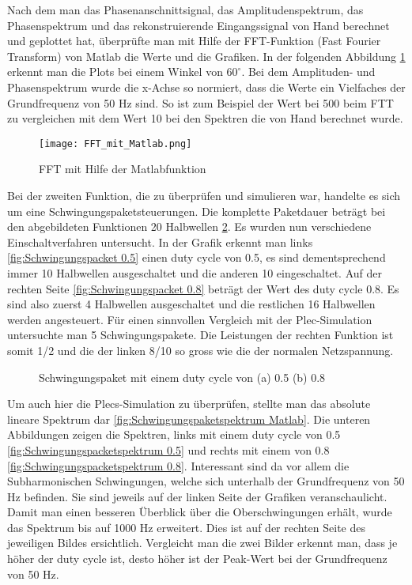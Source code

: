 Nach dem man das Phasenanschnittsignal, das Amplitudenspektrum,  das Phasenspektrum und das rekonstruierende Eingangssignal von Hand berechnet und geplottet hat, überprüfte man mit Hilfe der FFT-Funktion (Fast Fourier Transform) von Matlab die Werte und die Grafiken. In der folgenden Abbildung \ref{fig:FFT mit Matlab} erkennt man die Plots bei einem Winkel von $60^\circ$. Bei dem Amplituden- und Phasenspektrum wurde die x-Achse so normiert, dass die Werte ein Vielfaches der Grundfrequenz von 50 Hz sind. So ist zum Beispiel der Wert bei 500 beim FTT zu vergleichen mit dem Wert 10 bei den Spektren die von Hand berechnet wurde.

\begin{figure}[ht!]
	\centering
	\texttt{[image: FFT\_mit\_Matlab.png]}	
	\caption{FFT mit Hilfe der Matlabfunktion}
	\label{fig:FFT mit Matlab}
\end{figure}

Bei der zweiten Funktion, die zu überprüfen und simulieren war, handelte es sich um eine Schwingungspaketsteuerungen. Die komplette Paketdauer beträgt bei den abgebildeten Funktionen 20 Halbwellen \ref{fig:Schwingungspaket Matlab}. Es wurden nun verschiedene Einschaltverfahren untersucht. In der Grafik  erkennt man links \ref{fig:Schwingungspacket 0.5} einen duty cycle von 0.5, es sind dementsprechend immer 10 Halbwellen  ausgeschaltet und die anderen 10 eingeschaltet. Auf der rechten Seite \ref{fig:Schwingungspacket 0.8} beträgt der Wert des duty cycle 0.8. Es sind also zuerst 4 Halbwellen ausgeschaltet und die restlichen 16 Halbwellen werden angesteuert. Für einen sinnvollen Vergleich mit der Plec-Simulation untersuchte man 5 Schwingungspakete. Die Leistungen der rechten Funktion ist somit 1/2 und die der linken 8/10 so gross wie die der normalen Netzspannung.

\begin{figure}[ht!]
	\centering
	\qquad
	\caption{Schwingungspaket mit einem duty cycle von (a) 0.5 (b) 0.8}
	\label{fig:Schwingungspaket Matlab}
\end{figure} 

Um auch hier die Plecs-Simulation zu überprüfen, stellte man das absolute lineare Spektrum dar \ref{fig:Schwingungspaketspektrum Matlab}. Die unteren  Abbildungen zeigen die Spektren, links mit einem duty cycle von 0.5 \ref{fig:Schwingungspacketspektrum 0.5} und rechts mit einem von 0.8 \ref{fig:Schwingungspacketspektrum 0.8}. Interessant sind da vor allem die Subharmonischen Schwingungen, welche sich unterhalb der Grundfrequenz von 50 Hz befinden. Sie sind jeweils auf der linken Seite der Grafiken veranschaulicht. Damit man einen besseren Überblick über die Oberschwingungen erhält, wurde das Spektrum bis auf 1000 Hz erweitert. Dies ist auf der rechten Seite des jeweiligen Bildes ersichtlich. Vergleicht man die zwei Bilder erkennt man, dass je höher der duty cycle ist, desto höher ist der Peak-Wert bei der Grundfrequenz von 50 Hz. 

